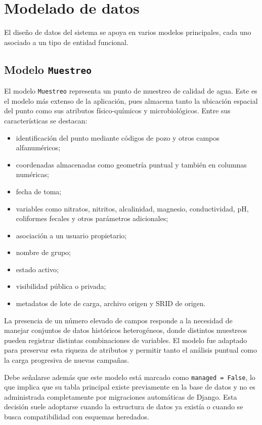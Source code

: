 \documentclass[12pt,a4paper]{report}
\begin{document}
\section{Modelado de datos}

El dise\~no de datos del sistema se apoya en varios modelos principales, cada uno asociado a un tipo de entidad funcional.

\subsection{Modelo \texttt{Muestreo}}

El modelo \texttt{Muestreo} representa un punto de muestreo de calidad de agua. Este es el modelo m\'as extenso de la aplicaci\'on, pues almacena tanto la ubicaci\'on espacial del punto como sus atributos f\'isico-qu\'imicos y microbiol\'ogicos. Entre sus caracter\'isticas se destacan:

\begin{itemize}
    \item identificaci\'on del punto mediante c\'odigos de pozo y otros campos alfanum\'ericos;
    \item coordenadas almacenadas como geometr\'ia puntual y tambi\'en en columnas num\'ericas;
    \item fecha de toma;
    \item variables como nitratos, nitritos, alcalinidad, magnesio, conductividad, pH, coliformes fecales y otros par\'ametros adicionales;
    \item asociaci\'on a un usuario propietario;
    \item nombre de grupo;
    \item estado activo;
    \item visibilidad p\'ublica o privada;
    \item metadatos de lote de carga, archivo origen y SRID de origen.
\end{itemize}

La presencia de un n\'umero elevado de campos responde a la necesidad de manejar conjuntos de datos hist\'oricos heterog\'eneos, donde distintos muestreos pueden registrar distintas combinaciones de variables. El modelo fue adaptado para preservar esta riqueza de atributos y permitir tanto el an\'alisis puntual como la carga progresiva de nuevas campa\~nas.

Debe se\~nalarse adem\'as que este modelo est\'a marcado como \texttt{managed = False}, lo que implica que su tabla principal existe previamente en la base de datos y no es administrada completamente por migraciones autom\'aticas de Django. Esta decisi\'on suele adoptarse cuando la estructura de datos ya exist\'ia o cuando se busca compatibilidad con esquemas heredados.
\end{document}
